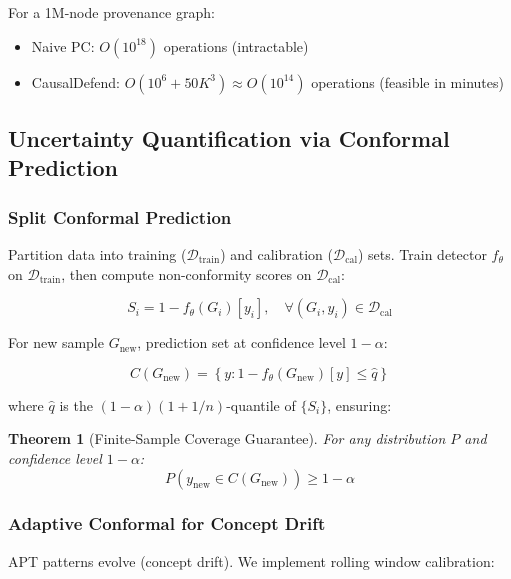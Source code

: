 \documentclass[conference]{IEEEtran}
\newtheorem{theorem}{Theorem}
\begin{document}
For a 1M-node provenance graph:
\begin{itemize}
    \item Naive PC: $O(10^{18})$ operations (intractable)
    \item CausalDefend: $O(10^6 + 50K^3) \approx O(10^{14})$ operations (feasible in minutes)
\end{itemize}

\subsection{Uncertainty Quantification via Conformal Prediction}

\subsubsection{Split Conformal Prediction}

Partition data into training ($\mathcal{D}_{\text{train}}$) and calibration ($\mathcal{D}_{\text{cal}}$) sets. Train detector $f_\theta$ on $\mathcal{D}_{\text{train}}$, then compute non-conformity scores on $\mathcal{D}_{\text{cal}}$:

\begin{equation}
S_i = 1 - f_\theta(G_i)[y_i], \quad \forall (G_i, y_i) \in \mathcal{D}_{\text{cal}}
\end{equation}

For new sample $G_{\text{new}}$, prediction set at confidence level $1-\alpha$:

\begin{equation}
C(G_{\text{new}}) = \left\{ y : 1 - f_\theta(G_{\text{new}})[y] \leq \hat{q} \right\}
\end{equation}

where $\hat{q}$ is the $(1-\alpha)(1 + 1/n)$-quantile of $\{S_i\}$, ensuring:

\begin{theorem}[Finite-Sample Coverage Guarantee]
For any distribution $P$ and confidence level $1-\alpha$:
\begin{equation}
P\left( y_{\text{new}} \in C(G_{\text{new}}) \right) \geq 1 - \alpha
\end{equation}
\end{theorem}

\subsubsection{Adaptive Conformal for Concept Drift}

APT patterns evolve (concept drift). We implement rolling window calibration:
\end{document}
